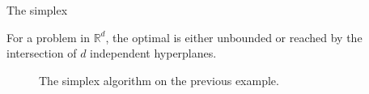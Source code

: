 \begin{frame}{The simplex}
\begin{theorem}
For a problem in $\mathbb{R}^d$, the optimal is either unbounded or reached by the intersection of $d$ independent hyperplanes.
\end{theorem}


\begin{figure}

The simplex algorithm on the previous example.
\end{figure}  

\end{frame}

